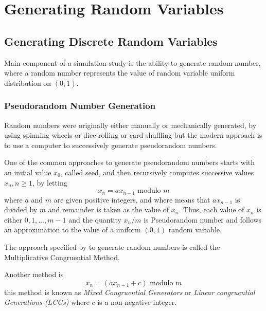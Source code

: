 \chapter{Generating Random Variables}

\section{Generating Discrete Random Variables}

Main component of a simulation study is the ability to generate random number, where a random number represents the value of random variable uniform
distribution on $(0,1)$.
\subsection{Pseudorandom Number Generation}
Random numbers were originally either manually or mechanically generated, by using spinning wheels or dice rolling or card shuffling
but the modern approach is to use a computer to successively generate pseudorandom numbers.

One of the common approaches to generate pseudorandom numbers starts with an initial value $x_0$, called seed, and then recursively computes
successive values $x_n, n\ge1$, by letting
\begin{equation}
	\label{MCM}
	x_n = a x_{n-1} \text{ modulo } m
\end{equation}
where $a$ and $m$ are given positive integers, and where  means that $ax_{n-1}$ is divided by  $m$ and remainder is taken as the
value of $x_n$. Thus, each value of $x_n$ is either $0,1, \ldots, m-1$ and the quantity $x_n / m$ is Pseudorandom number and follows
an approximation to the value of a uniform $(0,1)$ random variable.

The approach specified by  to generate random numbers is called the Multiplicative Congruential Method.

Another method is
\[
	x_n = (a x_{n-1}+c) \text{ modulo } m
\]
this method is known as \textit{Mixed Congruential Generators} or \textit{Linear congruential Generations (LCGs)} where $c$ is a non-negative integer.

